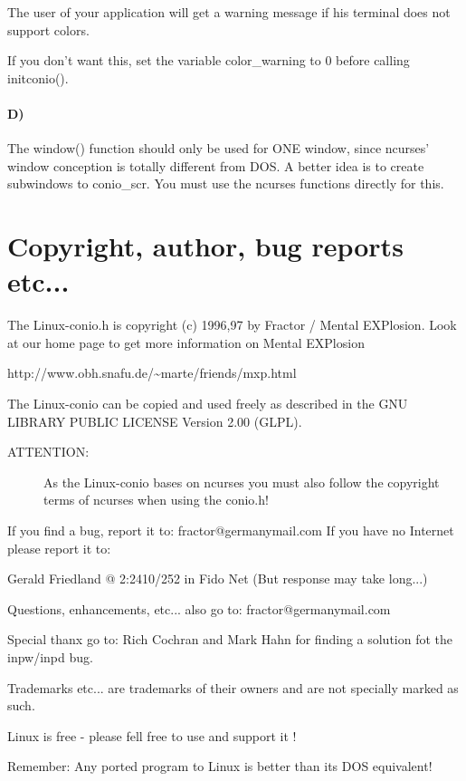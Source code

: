 \documentclass[10pt,a4paper,oneside,onecolumn]{article}
\begin{document}
The user of your application will get a warning message if his terminal
does not support colors.

If you don't want this, set the variable color\_warning to 0 before
calling initconio().


\paragraph{D) }

The window() function should only be used for ONE window, since ncurses'
window conception is totally different from DOS. A better idea is
to create subwindows to conio\_scr. You must use the ncurses functions
directly for this.


\section{Copyright, author, bug reports etc...}

The Linux-conio.h is copyright (c) 1996,97 by Fractor / Mental EXPlosion.
Look at our home page to get more information on Mental EXPlosion


http://www.obh.snafu.de/\~{}marte/friends/mxp.html

The Linux-conio can be copied and used freely as described in the
GNU LIBRARY PUBLIC LICENSE Version 2.00 (GLPL).

\begin{description}

\item [ATTENTION:]As the Linux-conio bases on ncurses you must also follow
the copyright terms of ncurses when using the conio.h! 

\end{description}

If you find a bug, report it to: fractor@germanymail.com If you have
no Internet please report it to: 

Gerald Friedland @ 2:2410/252 in Fido Net (But response may take long...)

Questions, enhancements, etc... also go to: fractor@germanymail.com

Special thanx go to: Rich Cochran and Mark Hahn for finding a solution
fot the inpw/inpd bug.

Trademarks etc... are trademarks of their owners and are not specially
marked as such.

Linux is free - please fell free to use and support it !

Remember: Any ported program to Linux is better than its DOS equivalent!
\end{document}
